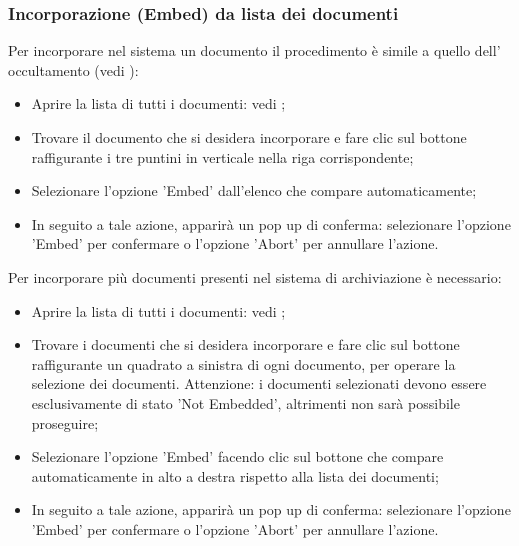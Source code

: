 \documentclass[10pt, a4paper]{article}
\begin{document}
\subsubsection{Incorporazione (Embed) da lista dei documenti}
Per incorporare nel sistema un documento il procedimento è simile a quello dell' occultamento (vedi ):
\begin{itemize}
    \item Aprire la lista di tutti i documenti: vedi ;
    \item Trovare il documento che si desidera incorporare e fare clic sul bottone raffigurante i tre puntini in verticale nella riga corrispondente;
    \item Selezionare l'opzione 'Embed' dall'elenco che compare automaticamente;
    \item In seguito a tale azione, apparirà un pop up di conferma: selezionare l'opzione 'Embed' per confermare o l'opzione 'Abort' per annullare l'azione.
\end{itemize}
Per incorporare più documenti presenti nel sistema di archiviazione è necessario:
\begin{itemize}
    \item Aprire la lista di tutti i documenti: vedi ;
    \item Trovare i documenti che si desidera incorporare e fare clic sul bottone raffigurante un quadrato a sinistra di ogni documento, per operare la selezione dei documenti. Attenzione: i documenti selezionati devono essere esclusivamente di stato 'Not Embedded', altrimenti non sarà possibile proseguire;
    \item Selezionare l'opzione 'Embed' facendo clic sul bottone che compare automaticamente in alto a destra rispetto alla lista dei documenti; 
    \item In seguito a tale azione, apparirà un pop up di conferma: selezionare l'opzione 'Embed' per confermare o l'opzione 'Abort' per annullare l'azione.
\end{itemize}
\end{document}

